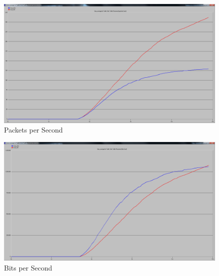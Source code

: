 \documentclass[letter,12pt]{article}
\begin{document}
	\begin{figure}[h!]
		\centering
			\includegraphics[width=.8\textwidth]{Packets_per_Sec.png}
		\caption{Packets per Second}
		\label{Packets_per_Sec}
	\end{figure}
	
	\begin{figure}[h!]
		\centering
			\includegraphics[width=.8\textwidth]{Bits_per_Sec.png}
		\caption{Bits per Second}
		\label{Bits_per_Sec}
	\end{figure}
	
\end{document}
